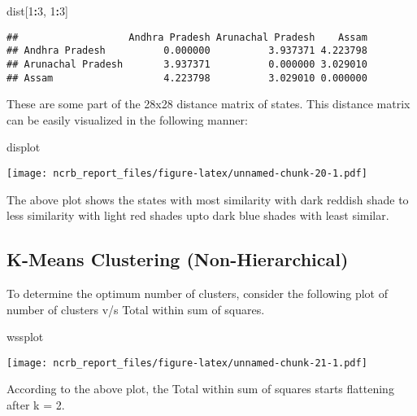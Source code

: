 \documentclass[
  12,
  a4paper,
]{report}
\newenvironment{Shaded}{\begin{snugshade}}{\end{snugshade}}
\newcommand{\DecValTok}[1]{\textcolor[rgb]{0.00,0.00,0.81}{#1}}
\newcommand{\NormalTok}[1]{#1}
\newcommand{\SpecialCharTok}[1]{\textcolor[rgb]{0.81,0.36,0.00}{\textbf{#1}}}
\begin{document}
\begin{Shaded}
\begin{Highlighting}[]
\NormalTok{dist[}\DecValTok{1}\SpecialCharTok{:}\DecValTok{3}\NormalTok{, }\DecValTok{1}\SpecialCharTok{:}\DecValTok{3}\NormalTok{]}
\end{Highlighting}
\end{Shaded}

\begin{verbatim}
##                   Andhra Pradesh Arunachal Pradesh    Assam
## Andhra Pradesh          0.000000          3.937371 4.223798
## Arunachal Pradesh       3.937371          0.000000 3.029010
## Assam                   4.223798          3.029010 0.000000
\end{verbatim}

These are some part of the 28x28 distance matrix of states. This
distance matrix can be easily visualized in the following manner:

\begin{Shaded}
\begin{Highlighting}[]
\NormalTok{displot}
\end{Highlighting}
\end{Shaded}

\texttt{[image: ncrb\_report\_files/figure-latex/unnamed-chunk-20-1.pdf]}

The above plot shows the states with most similarity with dark reddish
shade to less similarity with light red shades upto dark blue shades
with least similar.

\hypertarget{k-means-clustering-non-hierarchical}{%
\subsection{K-Means Clustering
(Non-Hierarchical)}\label{k-means-clustering-non-hierarchical}}

To determine the optimum number of clusters, consider the following plot
of number of clusters v/s Total within sum of squares.

\begin{Shaded}
\begin{Highlighting}[]
\NormalTok{wssplot}
\end{Highlighting}
\end{Shaded}

\texttt{[image: ncrb\_report\_files/figure-latex/unnamed-chunk-21-1.pdf]}

According to the above plot, the Total within sum of squares starts
flattening after k = 2.
\end{document}
